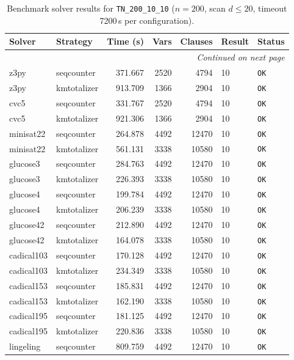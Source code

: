 \begin{longtable}{llrrrl p{}}
\caption{Benchmark solver results for \texttt{TN\_200\_10\_10} ($n=200$, scan $d \leq 20$, timeout 7200\,s per configuration).} \label{tab:bench-TN_200_10_10} \\
\toprule
Solver & Strategy & Time (s) & Vars & Clauses & Result & Status \\
\midrule
\endhead
\midrule
\multicolumn{7}{r}{\textit{Continued on next page}} \\
\midrule
\endfoot
\bottomrule
\endlastfoot
z3py & seqcounter & 371.667 & 2520 & 4794 & 10 & \texttt{OK} \\
z3py & kmtotalizer & 913.709 & 1366 & 2904 & 10 & \texttt{OK} \\
cvc5 & seqcounter & 331.767 & 2520 & 4794 & 10 & \texttt{OK} \\
cvc5 & kmtotalizer & 921.306 & 1366 & 2904 & 10 & \texttt{OK} \\
minisat22 & seqcounter & 264.878 & 4492 & 12470 & 10 & \texttt{OK} \\
minisat22 & kmtotalizer & 561.131 & 3338 & 10580 & 10 & \texttt{OK} \\
glucose3 & seqcounter & 284.763 & 4492 & 12470 & 10 & \texttt{OK} \\
glucose3 & kmtotalizer & 226.393 & 3338 & 10580 & 10 & \texttt{OK} \\
glucose4 & seqcounter & 199.784 & 4492 & 12470 & 10 & \texttt{OK} \\
glucose4 & kmtotalizer & 206.239 & 3338 & 10580 & 10 & \texttt{OK} \\
glucose42 & seqcounter & 212.890 & 4492 & 12470 & 10 & \texttt{OK} \\
glucose42 & kmtotalizer & 164.078 & 3338 & 10580 & 10 & \texttt{OK} \\
cadical103 & seqcounter & 170.128 & 4492 & 12470 & 10 & \texttt{OK} \\
cadical103 & kmtotalizer & 234.349 & 3338 & 10580 & 10 & \texttt{OK} \\
cadical153 & seqcounter & 185.831 & 4492 & 12470 & 10 & \texttt{OK} \\
cadical153 & kmtotalizer & 162.190 & 3338 & 10580 & 10 & \texttt{OK} \\
cadical195 & seqcounter & 181.125 & 4492 & 12470 & 10 & \texttt{OK} \\
cadical195 & kmtotalizer & 220.836 & 3338 & 10580 & 10 & \texttt{OK} \\
lingeling & seqcounter & 809.759 & 4492 & 12470 & 10 & \texttt{OK} \\

\end{longtable}
